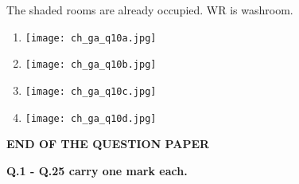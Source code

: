 \documentclass[12pt]{article}
\begin{document}
\begin{enumerate}[label=\textbf{Q.\arabic*}., start=6, leftmargin=*]
The shaded rooms are already occupied. WR is washroom.

\begin{multicols}{2}
\begin{enumerate}[label=(\Alph*)]
	\item \texttt{[image: ch\_ga\_q10a.jpg]}
	\item \texttt{[image: ch\_ga\_q10b.jpg]}
	\item \texttt{[image: ch\_ga\_q10c.jpg]}
	\item \texttt{[image: ch\_ga\_q10d.jpg]}
\end{enumerate}
\end{multicols}
\vspace{\baselineskip}
		\begin{center}
			{\textbf{END OF THE QUESTION PAPER}}
		\end{center}
		\newpage
\end{enumerate}
\setcounter{page}{1}
\noindent\textbf{Q.1 - Q.25 carry one mark each.}
\end{document}
